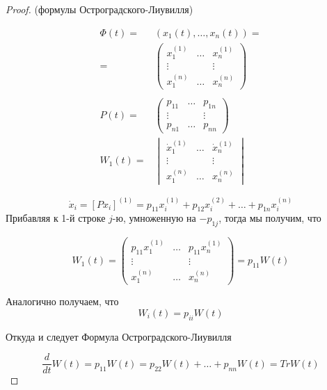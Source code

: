 \documentclass[a4paper]{article}
\theoremstyle{indented}
\theoremstyle{definition}
\theoremstyle{remark}
\begin{document}
\begin{proof}
  (формулы Остроградского-Лиувилля)

  \begin{equation*}
    \begin{aligned}
      \Phi(t) =& (x_1(t),\ldots,x_n(t))  = \\
      = &
      \begin{pmatrix}
        x_1^{(1)}& \ldots & x_n^{(1)} \\
        \vdots & & \vdots \\
        x_1^{(n)} & \ldots & x_n^{(n)}
      \end{pmatrix}
      \\
      \\
      P(t) = & \begin{pmatrix}
        p_{11} & \ldots & p_{1n} \\
        \vdots & & \vdots \\
        p_{n1} & \ldots & p_{nn}
      \end{pmatrix}
      \\
      W_1(t) = &
      \begin{vmatrix}
        \dot x_1^{(1)}& \ldots & \dot x_n^{(1)} \\
        \vdots & & \vdots \\
        x_1^{(n)} & \ldots & x_n^{(n)}
      \end{vmatrix}
  \end{aligned}
\end{equation*}

  \[\dot x_i= [Px_i]^{(1)} = p_{11}  x_i^{(1)} + p_{12}x_i^{(2)} + \ldots + p_{1n}x_i^{(n)}\]
  Прибавляя к 1-й строке $j$-ю, умноженную на $-p_{1j}$, тогда мы получим, что 

  \[W_1(t) =
  \begin{pmatrix}
    p_{11}x_1^{(1)} & \ldots & p_{11}x_n^{(1)} \\
    \vdots & & \vdots \\
    x_1^{(n)} & \ldots & x_n^{(n)}
  \end{pmatrix} = p_{11}W(t)\]
\begin{center}
  Аналогично получаем, что \[W_i(t) = p_{ii}W(t)\]
  
  Откуда и следует Формула Остроградского-Лиувилля
\end{center}

\[\frac{d}{dt}W(t) = p_{11}W(t) = p_{22}W(t) + \ldots + p_{nn}W(t) = Tr W(t)\]
\end{proof}
\end{document}
